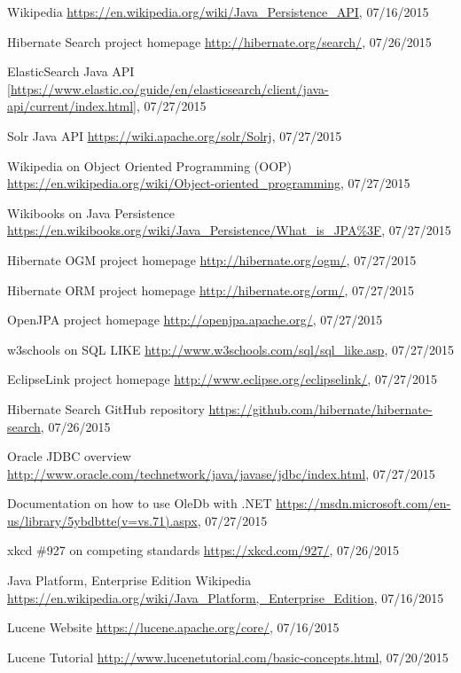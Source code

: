 %
%
\begin{thebibliography}{99}
	Wikipedia
	\url{https://en.wikipedia.org/wiki/Java_Persistence_API}, 07/16/2015
	
	Hibernate Search project homepage
	\url{http://hibernate.org/search/}, 07/26/2015
	
	ElasticSearch Java API
	\url{[https://www.elastic.co/guide/en/elasticsearch/client/java-api/current/index.html]}, 07/27/2015
	
	Solr Java API
	\url{https://wiki.apache.org/solr/Solrj}, 07/27/2015
	
	Wikipedia on Object Oriented Programming (OOP)
	\url{https://en.wikipedia.org/wiki/Object-oriented_programming}, 07/27/2015
	
	Wikibooks on Java Persistence
	\url{https://en.wikibooks.org/wiki/Java_Persistence/What_is_JPA\%3F}, 07/27/2015
	
	Hibernate OGM project homepage
	\url{http://hibernate.org/ogm/}, 07/27/2015
	
	Hibernate ORM project homepage
	\url{http://hibernate.org/orm/}, 07/27/2015
	
	OpenJPA project homepage
	\url{http://openjpa.apache.org/}, 07/27/2015
	
	w3schools on SQL LIKE
	\url{http://www.w3schools.com/sql/sql_like.asp}, 07/27/2015
	
	EclipseLink project homepage
	\url{http://www.eclipse.org/eclipselink/}, 07/27/2015
	
	Hibernate Search GitHub repository
	\url{https://github.com/hibernate/hibernate-search}, 07/26/2015
	
	Oracle JDBC overview
	\url{http://www.oracle.com/technetwork/java/javase/jdbc/index.html}, 07/27/2015
	
	Documentation on how to use OleDb with .NET
	\url{https://msdn.microsoft.com/en-us/library/5ybdbtte(v=vs.71).aspx}, 07/27/2015
	
	xkcd \#927 on competing standards
	\url{https://xkcd.com/927/}, 07/26/2015
	
	Java Platform, Enterprise Edition
	Wikipedia
	\url{https://en.wikipedia.org/wiki/Java_Platform,_Enterprise_Edition}, 07/16/2015
	
	Lucene Website
	\url{https://lucene.apache.org/core/}, 07/16/2015
	
	Lucene Tutorial
	\url{http://www.lucenetutorial.com/basic-concepts.html}, 07/20/2015
	
	
\end{thebibliography}